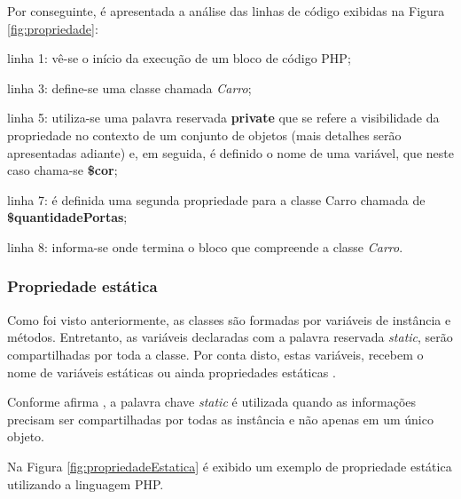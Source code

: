 \FloatBarrier 	%

Por conseguinte, é apresentada a análise das linhas de código
exibidas na Figura \ref{fig:propriedade}:

\begin{alineas}
    \item linha 1: vê-se o início da execução de um bloco de código PHP;
    \item linha 3: define-se uma classe chamada \textit{Carro};
    \item linha 5: utiliza-se uma palavra reservada \textbf{private} que se
    refere a visibilidade da propriedade no contexto de um conjunto de objetos
    (mais detalhes serão apresentadas adiante) e, em seguida, é definido o nome
    de uma variável, que neste caso chama-se \textbf{\$cor};
    \item linha 7: é definida uma segunda propriedade para a classe
    Carro chamada de \textbf{\$quantidadePortas};
    \item linha 8: informa-se onde termina o bloco que compreende a
    classe \textit{Carro}.
\end{alineas}

\subsubsection{Propriedade estática}

Como foi visto anteriormente, as classes são formadas por variáveis de instância
e métodos. Entretanto, as variáveis declaradas com a palavra
reservada \textit{static}, serão compartilhadas por toda a classe. Por conta
disto, estas variáveis, recebem o nome de variáveis estáticas ou ainda
propriedades estáticas \cite{learningJava}.

Conforme afirma , a palavra chave \textit{static}
é utilizada quando as informações precisam ser compartilhadas por todas
as instância e não apenas em um único objeto.

Na Figura \ref{fig:propriedadeEstatica} é exibido um exemplo de propriedade
estática utilizando a linguagem \acs{PHP}.

